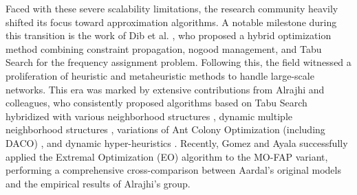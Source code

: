 \documentclass[letterpaper,journal]{IEEEtran}
\begin{document}
Faced with these severe scalability limitations, the research community heavily shifted its focus toward approximation algorithms. 
A notable milestone during this transition is the work of Dib et al. \cite{Dib2009}, who proposed a hybrid optimization method combining constraint propagation, nogood management, and Tabu Search for the frequency assignment problem.
Following this, the field witnessed a proliferation of heuristic and metaheuristic methods to handle large-scale networks.  
This era was marked by extensive contributions from Alrajhi and colleagues, who consistently proposed algorithms based on Tabu Search hybridized with various neighborhood structures \cite{Alrajhi2016_Hybridized}, dynamic multiple neighborhood structures \cite{Alrajhi2023Neighborhood}, variations of Ant Colony Optimization (including DACO) \cite{Alrajhi2023AntMetaheuristic, Alrajhi2023DynamicACO}, and dynamic hyper-heuristics \cite{Alrajhi2023DynamicHyper}.
Recently, Gomez and Ayala \cite{Gomez2023MO} successfully applied the Extremal Optimization (EO) algorithm to the MO-FAP variant, performing a comprehensive cross-comparison between Aardal's original models \cite{Aardal2007} and the empirical results of Alrajhi's group.
\end{document}
